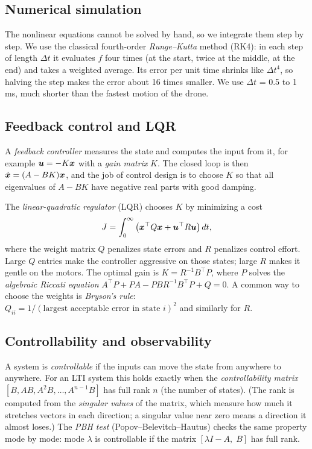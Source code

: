 \subsection{Numerical simulation}
The nonlinear equations cannot be solved by hand, so we integrate them step by step. We use the classical fourth-order \emph{Runge--Kutta} method (RK4): in each step of length $\Delta t$ it evaluates $f$ four times (at the start, twice at the middle, at the end) and takes a weighted average. Its error per unit time shrinks like $\Delta t^4$, so halving the step makes the error about 16 times smaller. We use $\Delta t$ = 0.5 to 1\,ms, much shorter than the fastest motion of the drone.

\subsection{Feedback control and LQR}
A \emph{feedback controller} measures the state and computes the input from it, for example $\boldsymbol{u} = -K\boldsymbol{x}$ with a \emph{gain matrix} $K$. The closed loop is then $\dot{\boldsymbol{x}} = (A-BK)\boldsymbol{x}$, and the job of control design is to choose $K$ so that all eigenvalues of $A-BK$ have negative real parts with good damping.

The \emph{linear-quadratic regulator} (LQR) chooses $K$ by minimizing a cost
\begin{equation}
  J = \int_0^\infty \big(\boldsymbol{x}^\top Q\boldsymbol{x} + \boldsymbol{u}^\top R\boldsymbol{u}\big)\,dt,
\end{equation}
where the weight matrix $Q$ penalizes state errors and $R$ penalizes control effort. Large $Q$ entries make the controller aggressive on those states; large $R$ makes it gentle on the motors. The optimal gain is $K = R^{-1}B^\top P$, where $P$ solves the \emph{algebraic Riccati equation} $A^\top P + PA - PBR^{-1}B^\top P + Q = 0$. A common way to choose the weights is \emph{Bryson's rule}: $Q_{ii} = 1/(\text{largest acceptable error in state } i)^2$ and similarly for $R$.

\subsection{Controllability and observability}
A system is \emph{controllable} if the inputs can move the state from anywhere to anywhere. For an LTI system this holds exactly when the \emph{controllability matrix} $[B, AB, A^2B,\dots,A^{n-1}B]$ has full rank $n$ (the number of states). (The rank is computed from the \emph{singular values} of the matrix, which measure how much it stretches vectors in each direction; a singular value near zero means a direction it almost loses.) The \emph{PBH test} (Popov--Belevitch--Hautus) checks the same property mode by mode: mode $\lambda$ is controllable if the matrix $[\lambda I - A,\; B]$ has full rank.

